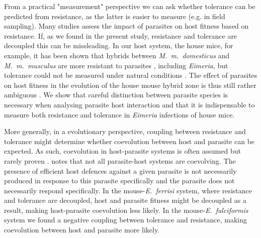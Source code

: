 From a practical "measurement" perspective we can ask whether tolerance can be predicted from resistance, as the latter is easier to measure (e.g. in field sampling). Many studies assess the impact of parasites on host fitness based on resistance. If, as we found in the present study, resistance and tolerance are decoupled this can be missleading. In our host system, the house mice, for example, it has been shown that hybrids between \textit{M.~m.~domesticus} and \textit{M.~m.~musculus} are more resistant to parasites \citep{baird_where_2012}, including \textit{Eimeria}, but tolerance could not be measured under natural conditions \citep{Balard2020}. The effect of parasites on host fitness in the evolution of the house mouse hybrid zone is thus still rather ambiguous \citep{baird_shifting_2019}. We show that careful distinction between parasite species is necessary when analysing parasite host interaction \parencite[see also][]{jarquin-diaz_detection_2019} and that it is indispensable to measure both resistance and tolerance in \textit{Eimeria} infections of house mice. \par

More generally, in a evolutionary perspective, coupling between resistance and tolerance might determine whether coevolution between host and parasite can be expected. As such, coevolution in host-parasite systems is often assumed but rarely proven \citep{Woolhouse2002}. \cite{Janzen1980} notes that not all parasite-host systems are coevolving. The presence of efficient host defences against a given parasite is not necessarily produced in response to this parasite specifically and the parasite does not necessarily respond specifically. In the mouse-\textit{E.~ferrisi} system, where resistance and tolerance are decoupled, host and parasite fitness might be decoupled as a result, making host-parasite coevolution less likely. In the mouse-\textit{E.~falciformis} system we found a negative coupling between tolerance and resistance, making coevolution between host and parasite more likely. \par

